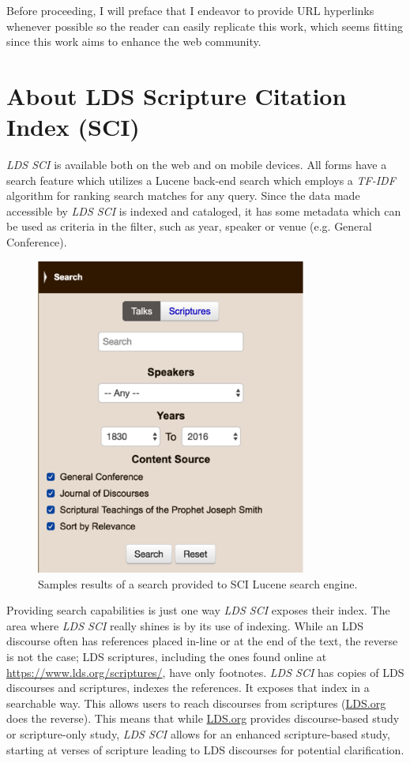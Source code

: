 Before proceeding, I will preface that I endeavor to provide URL hyperlinks whenever possible so the reader can easily replicate this work, which seems fitting since this work aims to enhance the web community.

\section{About LDS Scripture Citation Index (SCI)}
\emph{LDS SCI} is available both on the web and on mobile devices. All forms have a search feature which utilizes a Lucene \citep{lucene:luke} back-end search which employs a \emph{TF-IDF} algorithm for ranking search matches for any query. Since the data made accessible by \emph{LDS SCI} is indexed and cataloged, it has some metadata which can be used as criteria in the filter, such as year, speaker or venue (e.g. General Conference).

\begin{figure}[hhhhhtb]
	\centering
		\includegraphics[width=3.5in,natwidth=310,natheight=442]{figures/sci_search.png}
		\caption[SCI \emph{TF-IDF} Search Results]{
			Samples results of a search provided to SCI Lucene search engine.
		}
	\label{fig:sci_search}
\end{figure}

Providing search capabilities is just one way \emph{LDS SCI} exposes their index. The area where \emph{LDS SCI} really shines is by its use of indexing. While an LDS discourse often has references placed in-line or at the end of the text, the reverse is not the case; LDS scriptures, including the ones found online at \url{https://www.lds.org/scriptures/}, have only footnotes. \emph{LDS SCI} has copies of LDS discourses and scriptures, indexes the references. It exposes that index in a searchable way. This allows users to reach discourses from scriptures (\url{LDS.org} does the reverse). This means that while \url{LDS.org} provides discourse-based study or scripture-only study, \emph{LDS SCI} allows for an enhanced scripture-based study, starting at verses of scripture leading to LDS discourses for potential clarification.


